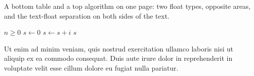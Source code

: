 \documentclass{article}
\begin{document}
A bottom table and a top algorithm on one page: two float types, opposite
areas, and the text-float separation on both sides of the text.

\begin{algorithm}[t]
\caption{Top of the page}
\begin{algorithmic}
\REQUIRE $n \geq 0$
\STATE $s \gets 0$
\STATE $s \gets s + i$
\ENDFOR
\ENSURE $s$
\end{algorithmic}
\end{algorithm}

\begin{table}[b]
\caption{Bottom of the page}
\end{table}

Ut enim ad minim veniam, quis nostrud exercitation ullamco laboris nisi ut
aliquip ex ea commodo consequat. Duis aute irure dolor in reprehenderit in
voluptate velit esse cillum dolore eu fugiat nulla pariatur.
\end{document}
